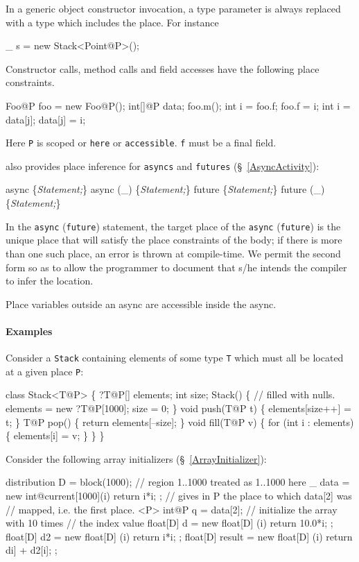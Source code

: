 In a generic object constructor invocation, a type parameter is always
replaced with a type which includes the place. For instance

\begin{x10}
    \_ s = new Stack<Point@P>();
\end{x10}

Constructor calls, method calls and field accesses have the following place constraints.
\begin{x10}
  Foo@P foo = new Foo@P();
  int[]@P data;
  foo.m();
  int i = foo.f;
  foo.f = i;
  int i = data[j];
  data[j] = i;
\end{x10}
Here {\tt P} is scoped or {\tt here} or {\tt accessible}. {\tt f}
must be a final field.

\Xten{} also provides place inference for {\tt asyncs} and {\tt futures} (\S~\ref{AsyncActivity}):

\begin{x10}
  async \{{\cf\em{}Statement;}\} 
  async (\_) \{{\cf\em{}Statement;}\}
  future \{{\cf\em{}Statement;}\} 
  future (\_) \{{\cf\em{}Statement;}\} 
\end{x10}

In the {\tt async} ({\tt future}) statement, the target place of the
{\tt async} ({\tt future}) is the unique place that will satisfy the
place constraints of the body; if there is more than one such place,
an error is thrown at compile-time. We permit the second form so as to
allow the programmer to document that s/he intends the compiler to
infer the location.

Place variables outside an async are accessible inside the async.

\paragraph{Examples}
Consider a {\tt Stack} containing elements of some type {\tt T} which must
all be located at a given place {\tt P}:
\begin{x10}
 class Stack<T@P> \{
     ?T@P[] elements;
     int size;
     Stack() \{
         // filled with nulls.
         elements = new ?T@P[1000]; 
         size = 0;
     \}
     void push(T@P t) \{ elements[size++] = t; \}
     T@P pop() \{ return elements[--size]; \}
     void fill(T@P v) \{ 
         for (int i : elements) \{ 
            elements[i] = v; 
         \} 
     \}
 \}
\end{x10}

Consider the following array initializers (\S~\ref{ArrayInitializer}):
\begin{x10}
  distribution D = block(1000);
  // region 1..1000 treated as 1..1000 here
  \_ data = new int@current[1000](i){ return i*i; }; 
    // gives in P the place to which data[2] was 
    // mapped, i.e. the first place.
  <P> int@P q = data[2]; 
    // initialize the array with 10 times 
    // the index value
  float[D] d = new float[D] (i){ return 10.0*i; };
  float[D] d2 = new float[D] (i){ return i*i; };
  float[D] result = 
    new float[D] (i){ return di] + d2[i]; };
\end{x10}

